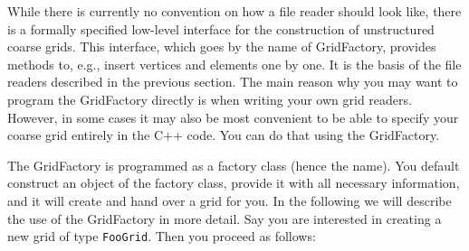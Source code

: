 \documentclass[11pt,a4paper,headinclude,footinclude,DIV16,normalheadings]{scrreprt}
\begin{document}
While there is currently no convention on how a file reader should look like,
there is a formally specified low-level interface for the construction of
unstructured coarse grids.  This interface, which goes by the name of
GridFactory, provides methods to, e.g., insert vertices and elements one by one.
It is the basis of the file readers described in the previous section.
The main reason why you may want to program the GridFactory directly is
when writing your own grid readers.  However, in some cases it may also be
most convenient to be able to specify your coarse grid entirely in the
C++ code.  You can do that using the GridFactory.

The GridFactory is programmed as a factory class (hence the name).
You default construct an object of the factory class, provide it with all
necessary information, and it will create and hand over a grid for you.
In the following we will describe the use of the GridFactory in more detail.
Say you are interested in creating a new grid of type \lstinline!FooGrid!.  Then
you proceed as follows:
\end{document}
